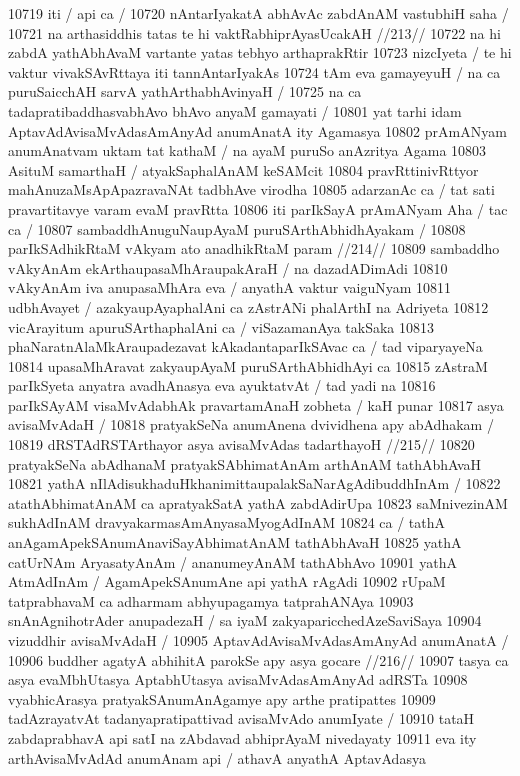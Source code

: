 10719 iti / api ca /
10720 	nAntarIyakatA abhAvAc zabdAnAM vastubhiH saha /
10721 	na arthasiddhis tatas te hi vaktRabhiprAyasUcakAH //213//
10722 na hi zabdA yathAbhAvaM vartante yatas tebhyo arthaprakRtir  
10723 nizcIyeta / te hi vaktur vivakSAvRttaya iti tannAntarIyakAs  
10724 tAm eva gamayeyuH / na ca puruSaicchAH sarvA yathArthabhAvinyaH /  
10725 na ca tadapratibaddhasvabhAvo bhAvo anyaM gamayati /
10801 yat tarhi idam AptavAdAvisaMvAdasAmAnyAd anumAnatA ity Agamasya
10802 prAmANyam anumAnatvam uktam tat kathaM / na ayaM puruSo anAzritya Agama
10803 AsituM samarthaH / atyakSaphalAnAM keSAMcit  
10804 pravRttinivRttyor mahAnuzaMsApApazravaNAt tadbhAve virodha 
10805 adarzanAc ca / tat sati pravartitavye varam evaM pravRtta 
10806 iti parIkSayA prAmANyam Aha / tac ca / 
10807 	sambaddhAnuguNaupAyaM puruSArthAbhidhAyakam /
10808 	parIkSAdhikRtaM vAkyam ato anadhikRtaM param //214//
10809 sambaddho vAkyAnAm ekArthaupasaMhAraupakAraH / na dazadADimAdi
10810 vAkyAnAm iva anupasaMhAra eva / anyathA vaktur vaiguNyam 
10811 udbhAvayet / azakyaupAyaphalAni ca zAstrANi phalArthI na Adriyeta
10812 vicArayitum apuruSArthaphalAni ca / viSazamanAya takSaka 
10813 phaNaratnAlaMkAraupadezavat kAkadantaparIkSAvac ca / tad viparyayeNa
10814 upasaMhAravat zakyaupAyaM puruSArthAbhidhAyi ca
10815 zAstraM parIkSyeta anyatra avadhAnasya eva ayuktatvAt / tad yadi na
10816 parIkSAyAM visaMvAdabhAk pravartamAnaH zobheta / kaH punar
10817 asya avisaMvAdaH / 
10818 	pratyakSeNa anumAnena dvividhena apy abAdhakam / 
10819 	dRSTAdRSTArthayor asya avisaMvAdas tadarthayoH //215//
10820 pratyakSeNa abAdhanaM pratyakSAbhimatAnAm arthAnAM tathAbhAvaH
10821 yathA nIlAdisukhaduHkhanimittaupalakSaNarAgAdibuddhInAm /
10822 atathAbhimatAnAM ca apratyakSatA yathA zabdAdirUpa  
10823 saMnivezinAM sukhAdInAM dravyakarmasAmAnyasaMyogAdInAM 
10824 ca / tathA anAgamApekSAnumAnaviSayAbhimatAnAM tathAbhAvaH
10825 yathA catUrNAm AryasatyAnAm / ananumeyAnAM tathAbhAvo  
10901 yathA AtmAdInAm / AgamApekSAnumAne api yathA rAgAdi 
10902 rUpaM tatprabhavaM ca adharmam abhyupagamya tatprahANAya 
10903 snAnAgnihotrAder anupadezaH / sa iyaM zakyaparicchedAzeSaviSaya
10904 vizuddhir avisaMvAdaH /  
10905 	AptavAdAvisaMvAdasAmAnyAd anumAnatA /  
10906 	buddher agatyA abhihitA parokSe apy asya gocare //216//
10907 tasya ca asya evaMbhUtasya AptabhUtasya avisaMvAdasAmAnyAd adRSTa
10908 vyabhicArasya pratyakSAnumAnAgamye apy arthe pratipattes  
10909 tadAzrayatvAt tadanyapratipattivad avisaMvAdo anumIyate /
10910 tataH zabdaprabhavA api satI na zAbdavad abhiprAyaM nivedayaty
10911 eva ity arthAvisaMvAdAd anumAnam api / athavA anyathA AptavAdasya
